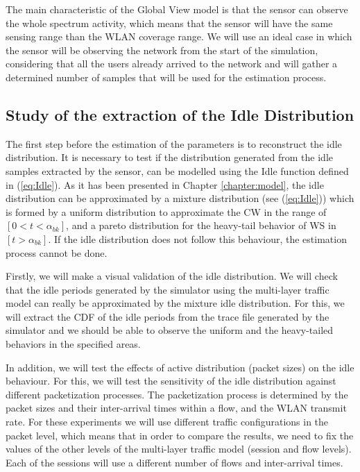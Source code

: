 The main characteristic of the Global View model is that the sensor can observe the whole spectrum activity, which means that the sensor will have the same sensing range than the \acs{WLAN} coverage range. We will use an ideal case in which the sensor will be observing the network from the start of the simulation, considering that all the users already arrived to the network and will gather a determined number of samples that will be used for the estimation process.

\subsection{Study of the extraction of the Idle Distribution} \label{sec:idle}
The first step before the estimation of the parameters is to reconstruct the idle distribution. It is necessary to test if the distribution generated from the idle samples extracted by the sensor, can be modelled using the Idle function defined in (\ref{eq:Idle}). As it has been presented in Chapter \ref{chapter:model}, the idle distribution can be approximated by a mixture distribution (see (\ref{eq:Idle})) which is formed by a uniform distribution to approximate the \acs{CW} in the range of $[0 < t < \alpha_{bk}]$, and a pareto distribution for the heavy-tail behavior of \acs{WS} in $[t > \alpha_{bk}]$. If the idle distribution does not follow this behaviour, the estimation process cannot be done.

Firstly, we will make a visual validation of the idle distribution. We will check that the idle periods generated by the simulator using the multi-layer traffic model can really be approximated by the mixture idle distribution. For this, we will extract the \acs{CDF} of the idle periods from the trace file generated by the simulator and we should be able to observe the uniform and the heavy-tailed behaviors in the specified areas.

In addition, we will test the effects of active distribution (packet sizes) on the idle behaviour. For this, we will test the sensitivity of the idle distribution against different packetization processes. The packetization process is determined by the packet sizes and their inter-arrival times within a flow, and the \acs{WLAN} transmit rate. For these experiments we will use different traffic configurations in the packet level, which means that in order to compare the results, we need to fix the values of the other levels of the multi-layer traffic model (session and flow levels). Each of the sessions will use a different number of flows and inter-arrival times.

